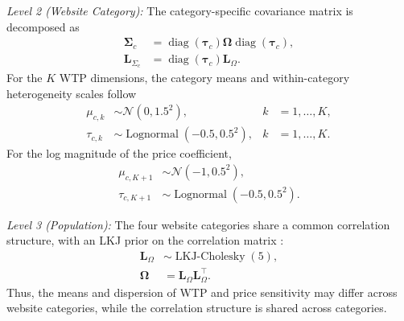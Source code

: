 \documentclass[12pt]{article}
\theoremstyle{definition}
\theoremstyle{remark}
\begin{document}
\begin{appendix}
\emph{Level 2 (Website Category):}
The category-specific covariance matrix is decomposed as
\begin{align*}
    \boldsymbol{\Sigma}_c
    &=
    \operatorname{diag}(\boldsymbol{\tau}_c)
    \boldsymbol{\Omega}
    \operatorname{diag}(\boldsymbol{\tau}_c),
    \\
    \mathbf L_{\Sigma_c}
    &=
    \operatorname{diag}(\boldsymbol{\tau}_c)
    \mathbf L_{\Omega}.
\end{align*}
For the $K$ WTP dimensions, the category means and within-category heterogeneity scales follow
\begin{align*}
    \mu_{c,k}
    &\sim
    \mathcal{N}(0,1.5^2),
    &
    k&=1,\ldots,K,
    \\
    \tau_{c,k}
    &\sim
    \operatorname{Lognormal}(-0.5,0.5^2),
    &
    k&=1,\ldots,K.
\end{align*}
For the log magnitude of the price coefficient,
\begin{align*}
    \mu_{c,K+1}
    &\sim
    \mathcal{N}(-1,0.5^2),
    \\
    \tau_{c,K+1}
    &\sim
    \operatorname{Lognormal}(-0.5,0.5^2).
\end{align*}

\emph{Level 3 (Population):}
The four website categories share a common correlation structure, with an LKJ prior on the correlation matrix \citep{lewandowski2009generating}:
\begin{align*}
    \mathbf L_{\Omega}
    &\sim
    \operatorname{LKJ\text{-}Cholesky}(5),
    \\
    \boldsymbol{\Omega}
    &=
    \mathbf L_{\Omega}
    \mathbf L_{\Omega}^{\top}.
\end{align*}
Thus, the means and dispersion of WTP and price sensitivity may differ across website categories, while the correlation structure is shared across categories.


\end{appendix}
\end{document}
